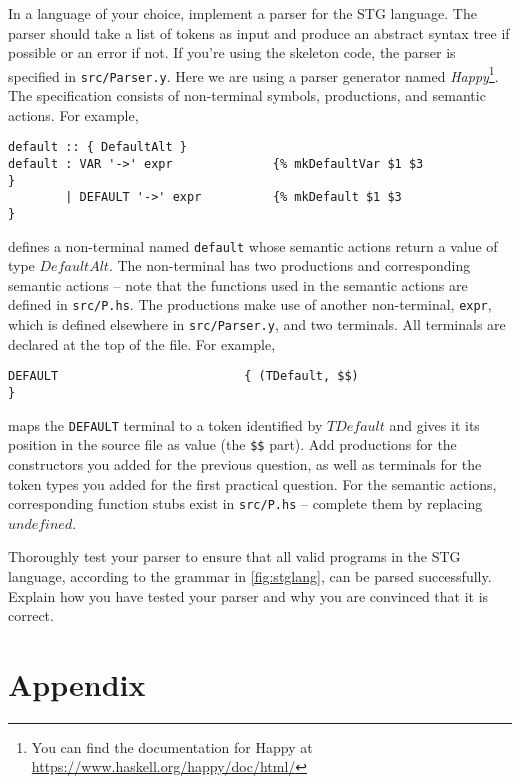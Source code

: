 \documentclass[10pt,a4paper]{exam} %
\begin{document}
\begin{questions}
\question In a language of your choice, implement a parser for the STG language. The parser should take a list of tokens as input and produce an abstract syntax tree if possible or an error if not. If you're using the skeleton code, the parser is specified in \texttt{src/Parser.y}. Here we are using a parser generator named \emph{Happy}\footnote{You can find the documentation for Happy at \url{https://www.haskell.org/happy/doc/html/}}. The specification consists of non-terminal symbols, productions, and semantic actions. For example,
\begin{verbatim}
default :: { DefaultAlt }
default : VAR '->' expr              {% mkDefaultVar $1 $3                  }
        | DEFAULT '->' expr          {% mkDefault $1 $3                     }
\end{verbatim}
defines a non-terminal named \texttt{default} whose semantic actions return a value of type $\mathit{DefaultAlt}$. The non-terminal has two productions and corresponding semantic actions -- note that the functions used in the semantic actions are defined in \texttt{src/P.hs}. The productions make use of another non-terminal, \texttt{expr}, which is defined elsewhere in \texttt{src/Parser.y}, and two terminals. All terminals are declared at the top of the file. For example,
\begin{verbatim}
DEFAULT                          { (TDefault, $$)                       }
\end{verbatim}
maps the \texttt{DEFAULT} terminal to a token identified by $\mathit{TDefault}$ and gives it its position in the source file as value (the \texttt{\$\$} part). Add productions for the constructors you added for the previous question, as well as terminals for the token types you added for the first practical question. For the semantic actions, corresponding function stubs exist in \texttt{src/P.hs} -- complete them by replacing $\mathit{undefined}$.

\question Thoroughly test your parser to ensure that all valid programs in the STG language, according to the grammar in \autoref{fig:stglang}, can be parsed successfully. Explain how you have tested your parser and why you are convinced that it is correct.
\end{questions}

\newpage
\section*{Appendix}
\end{document}

